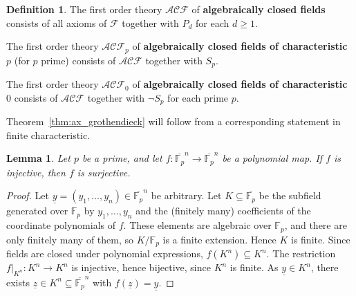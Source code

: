 \documentclass[12pt]{article}
\theoremstyle{plain}
\newtheorem{lemma}[thm]{Lemma}
\theoremstyle{definition}
\newtheorem{defn}[thm]{Definition}
\newcommand{\bb}[1]{\mathbb{#1}}
\newcommand{\call}[1]{\mathcal{#1}}
\newcommand{\lto}{\longrightarrow}
\begin{document}
\begin{defn}
The first order theory $\call{ACF}$ of \textbf{algebraically closed fields} consists of all axioms of $\call{F}$ together with $P_d$ for each $d \geq 1$.

The first order theory $\call{ACF}_p$ of \textbf{algebraically closed fields of characteristic $p$} (for $p$ prime) consists of $\call{ACF}$ together with $S_p$.

The first order theory $\call{ACF}_0$ of \textbf{algebraically closed fields of characteristic $0$} consists of $\call{ACF}$ together with $\neg S_p$ for each prime $p$.
\end{defn}

Theorem~\ref{thm:ax_grothendieck} will follow from a corresponding statement in finite characteristic.

\begin{lemma}\label{lem:finite_characteristic_ax}
Let $p$ be a prime, and let $f: \overline{\bb{F}_p}^n \lto \overline{\bb{F}_p}^n$ be a polynomial map. If $f$ is injective, then $f$ is surjective.
\end{lemma}
\begin{proof}
Let $\underline{y} = (y_1,\ldots,y_n) \in \overline{\bb{F}_p}^n$ be arbitrary. Let $K \subseteq \overline{\bb{F}_p}$ be the subfield generated over $\bb{F}_p$ by $y_1,\ldots,y_n$ and the (finitely many) coefficients of the coordinate polynomials of $f$. These elements are algebraic over $\bb{F}_p$, and there are only finitely many of them, so $K/\bb{F}_p$ is a finite extension. Hence $K$ is finite. Since fields are closed under polynomial expressions, $f(K^n) \subseteq K^n$. The restriction $f|_{K^n}: K^n \lto K^n$ is injective, hence bijective, since $K^n$ is finite. As $\underline{y} \in K^n$, there exists $\underline{z} \in K^n \subseteq \overline{\bb{F}_p}^n$ with $f(\underline{z}) = \underline{y}$.
\end{proof}
\end{document}
